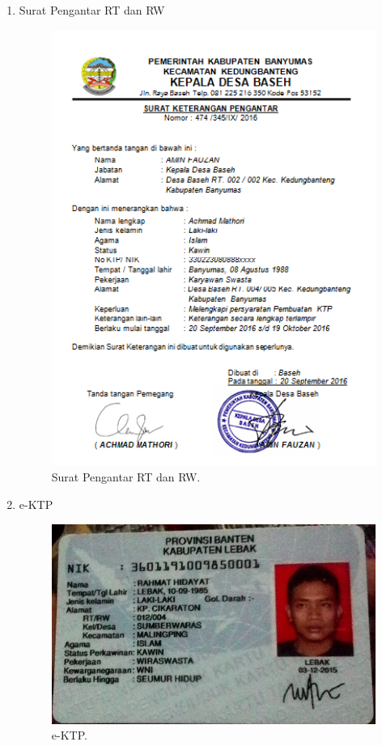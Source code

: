 \begin{enumerate}
	\item Surat Pengantar RT dan RW
	\begin{figure}[H]
		\centering
		\includegraphics[width=12cm]{figures/surat.png}
		\caption{Surat Pengantar RT dan RW.}	
	\end{figure}

	\item e-KTP
	\begin{figure}[H]
		\centering
		\includegraphics[width=12cm]{figures/ktp.jpg}
		\caption{e-KTP.}	
	\end{figure}

\end{enumerate}